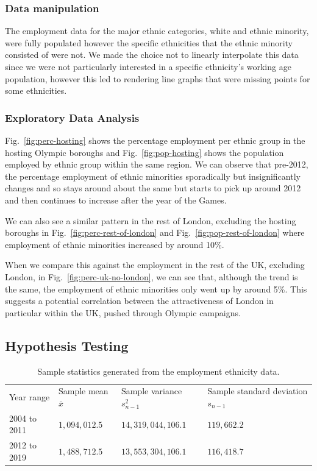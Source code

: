 \documentclass[12pt,twoside]{article}
\begin{document}
\subsubsection{Data manipulation}
The employment data for the major ethnic categories, white and ethnic minority, were fully populated however the specific ethnicities that the ethnic minority consisted of were not. We made the choice not to linearly interpolate this data since we were not particularly interested in a specific ethnicity's working age population, however this led to rendering line graphs that were missing points for some ethnicities.
\subsubsection{Exploratory Data Analysis}
Fig.~\ref{fig:perc-hosting} shows the percentage employment per ethnic group in the hosting Olympic boroughs and Fig.~\ref{fig:pop-hosting} shows the population employed by ethnic group within the same region. We can observe that pre-2012, the percentage employment of ethnic minorities sporadically but insignificantly changes and so stays around about the same but starts to pick up around 2012 and then continues to increase after the year of the Games.

We can also see a similar pattern in the rest of London, excluding the hosting boroughs in Fig.~\ref{fig:perc-rest-of-london} and Fig.~\ref{fig:pop-rest-of-london} where employment of ethnic minorities increased by around 10\%.

When we compare this against the employment in the rest of the UK, excluding London, in Fig.~\ref{fig:perc-uk-no-london}, we can see that, although the trend is the same, the employment of ethnic minorities only went up by around 5\%. This suggests a potential correlation between the attractiveness of London in particular within the UK, pushed through Olympic campaigns.

\subsection{Hypothesis Testing}
\begin{table}[!htb]
\caption{Sample statistics generated from the employment ethnicity data.}
\label{tab:results}
\centering
\begin{tabular}{llll}
Year range & Sample mean $\overline{x}$ & Sample variance $s_{n-1}^2$ & Sample standard deviation $s_{n-1}$\\
2004 to 2011 & $1,094,012.5$ & $14,319,044,106.1$ & $119,662.2$\\
2012 to 2019 & $1,488,712.5$ & $13,553,304,106.1$ & $116,418.7$\\
\end{tabular}
\end{table}
\end{document}
